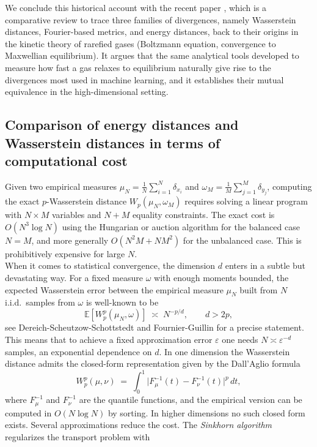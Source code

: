 \documentclass[12pt,a4paper,oneside]{amsart}
\theoremstyle{plain}
\theoremstyle{definition}
\numberwithin{equation}{section}
\numberwithin{figure}{section}
\numberwithin{table}{section}
\theoremstyle{remark}
\newcommand{\E}{\mathbb{E}}
\begin{document}
We conclude this historical account with the recent paper \cite{auricchio2026kinetic}, which is a comparative review to trace three families of divergences, namely Wasserstein distances, Fourier-based metrics, and energy distances, back to their origins in the kinetic theory of rarefied gases (Boltzmann equation, convergence to Maxwellian equilibrium). It argues that the same analytical tools developed to measure how fast a gas relaxes to equilibrium naturally give rise to the divergences most used in machine learning, and it establishes their mutual equivalence in the high-dimensional setting. 

\subsection{Comparison of energy distances and Wasserstein distances in terms of computational cost}\label{sec:compENvsWas}
 Given two empirical measures $\mu_N = \frac1N\sum_{i=1}^N \delta_{x_i}$ and
$\omega_M = \frac{1}{M}\sum_{j=1}^M \delta_{y_j}$, computing the exact $p$-Wasserstein
distance $W_p(\mu_N, \omega_M)$ requires solving a linear program with $N \times M$
variables and $N + M$ equality constraints. The exact cost is $O(N^3 \log N)$ using
the Hungarian or auction algorithm for the balanced case $N = M$, and more generally
$O(N^2 M + N M^2)$ for the unbalanced case. This is prohibitively expensive for
large $N$.\\
When it comes to statistical convergence, the dimension $d$ enters in a subtle but
devastating way. For a fixed measure $\omega$ with enough moments bounded, the expected Wasserstein error between the empirical
measure $\mu_N$ built from $N$ i.i.d.\ samples from $\omega$ is well-known to be
\[
  \E[W_p^p(\mu_N, \omega)] \;\asymp\; N^{-p/d},
  \qquad d > 2 p,
\]
see 
Dereich-Scheutzow-Schottstedt \cite{dereich} and
Fournier-Guillin \cite{fournier2015rate} for a precise statement. This means that to achieve a fixed approximation error $\varepsilon$ one
needs $N \asymp \varepsilon^{-d}$ samples, an exponential dependence on $d$.
In one dimension the Wasserstein distance admits the closed-form representation given by the Dall'Aglio formula \cite{dallaglio}
\[
W_p^p(\mu, \nu)
\;=\;
  \int_0^1 \bigl|F_\mu^{-1}(t) - F_\nu^{-1}(t)\bigr|^p \, dt,
\]
% 
where $F_\mu^{-1}$ and $F_\nu^{-1}$ are the quantile functions, and the empirical
version can be computed in $O(N \log N)$ by sorting. In higher dimensions no such
closed form exists.
Several approximations reduce the cost.
The \emph{Sinkhorn algorithm} \cite{cuturi2013sinkhorn,peyre2019computational} regularizes the transport problem with
\end{document}
